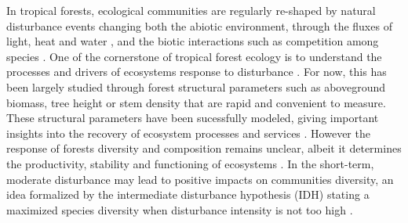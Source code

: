 \documentclass[fleqn,10pt]{ArtEcoFoG} %
\begin{document}
In tropical forests, ecological communities are regularly re-shaped by
natural disturbance events changing both the abiotic environment,
through the fluxes of light, heat and water \citep{Goulamoussene2017},
and the biotic interactions such as competition among species
\citep{Chesson2000}. One of the cornerstone of tropical
forest ecology is to understand the processes and drivers of ecosystems
response to disturbance \citep{Chazdon2003a}. For now, this has been
largely studied through forest structural parameters such as aboveground
biomass, tree height or stem density
\citep{Piponiot2016, Rutishauser2016} that are rapid and convenient to
measure. These structural parameters have been sucessfully modeled,
giving important insights into the recovery of ecosystem processes and
services \citep{Herault2018}. However the response of forests diversity
and composition remains unclear, albeit it determines the productivity,
stability and functioning of ecosystems \citep{Tilman2014, Liang2016}.
In the short-term, moderate disturbance may lead to positive impacts on
communities diversity, an idea formalized by the intermediate
disturbance hypothesis (IDH) stating a maximized species diversity when
disturbance intensity is not too high \citep{Molino2001, Kariuki2006a}.
\end{document}
